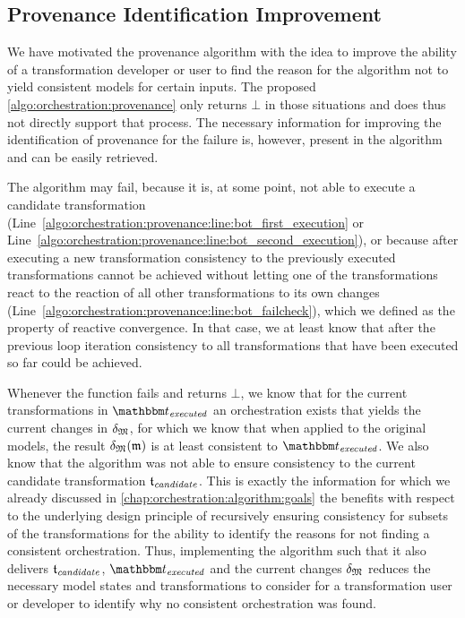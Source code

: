 \subsection{Provenance Identification Improvement}

We have motivated the provenance algorithm with the idea to improve the ability of a transformation developer or user to find the reason for the algorithm not to yield consistent models for certain inputs.
The proposed \autoref{algo:orchestration:provenance} only returns $\bot$ in those situations and does thus not directly support that process.
The necessary information for improving the identification of provenance for the failure is, however, present in the algorithm and can be easily retrieved.

The algorithm may fail, because it is, at some point, not able to execute a candidate transformation (Line~\ref{algo:orchestration:provenance:line:bot_first_execution} or Line~\ref{algo:orchestration:provenance:line:bot_second_execution}), or because after executing a new transformation consistency to the previously executed transformations cannot be achieved without letting one of the transformations react to the reaction of all other transformations to its own changes (Line~\ref{algo:orchestration:provenance:line:bot_failcheck}), which we defined as the property of reactive convergence.
In that case, we at least know that after the previous loop iteration consistency to all transformations that have been executed so far could be achieved.

Whenever the  function fails and returns $\bot$, we know that for the current transformations in $\provalgexecuted$ an orchestration exists that yields the current changes in $\changetuple{\metamodeltuple{M}}$, %
for which we know that when applied to the original models, the result $\changetuple{\metamodeltuple{M}}(\modeltuple{m})$ %
is at least consistent to $\provalgexecuted$.
We also know that the algorithm was not able to ensure consistency to the current candidate transformation $\provalgcandidate$.
This is exactly the information for which we already discussed in \autoref{chap:orchestration:algorithm:goals} the benefits with respect to the underlying design principle of recursively ensuring consistency for subsets of the transformations for the ability to identify the reasons for not finding a consistent orchestration.
Thus, implementing the algorithm such that it also delivers $\provalgcandidate$, $\provalgexecuted$ and the current changes $\changetuple{\metamodeltuple{M}}$ reduces the necessary model states and transformations to consider for a transformation user or developer to identify why no consistent orchestration was found.

